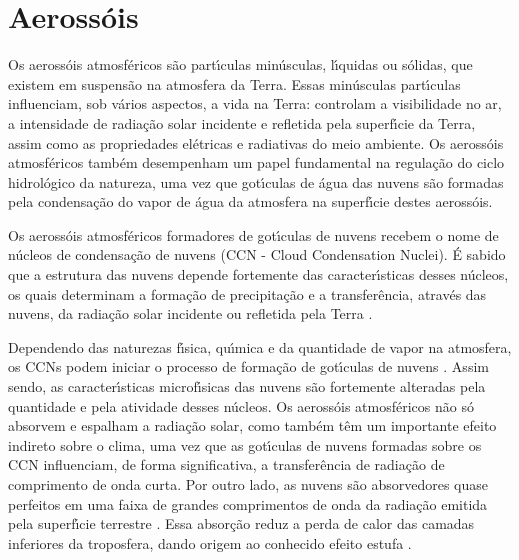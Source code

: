\doublespacing
\chapter{Aeross\'{o}is}
\label{cap:aerossois}

Os aeross\'{o}is atmosf\'{e}ricos s\~{a}o part\'{\i}culas min\'{u}sculas, l\'{\i}quidas ou s\'{o}lidas, que existem em suspens\~{a}o na atmosfera da Terra. Essas min\'{u}sculas part\'{\i}culas influenciam, sob v\'{a}rios aspectos, a vida na Terra: controlam a visibilidade no ar, a intensidade de radia\c{c}\~{a}o solar incidente e refletida pela superf\'{\i}cie da Terra, assim como as propriedades el\'{e}tricas e radiativas do meio ambiente. Os aeross\'{o}is atmosf\'{e}ricos tamb\'{e}m desempenham um papel fundamental na regula\c{c}\~{a}o do ciclo hidrol\'{o}gico da natureza, uma vez que got\'{\i}culas de \'{a}gua das nuvens s\~{a}o formadas pela condensa\c{c}\~{a}o do vapor de \'{a}gua da atmosfera na superf\'{\i}cie destes aeross\'{o}is.

Os aeross\'{o}is atmosf\'{e}ricos formadores de got\'{\i}culas de nuvens recebem o nome de n\'{u}cleos de condensa\c{c}\~{a}o de nuvens (CCN - Cloud Condensation Nuclei). \'{E} sabido que a estrutura das nuvens depende fortemente das caracter\'{\i}sticas desses n\'{u}cleos, os quais determinam a forma\c{c}\~{a}o de precipita\c{c}\~{a}o e a transfer\^{e}ncia, atrav\'{e}s das nuvens, da radia\c{c}\~{a}o solar incidente ou refletida pela Terra \cite{Mendes}.

Dependendo das naturezas f\'{\i}sica, qu\'{\i}mica e da quantidade de vapor na atmosfera, os CCNs podem iniciar o processo de forma\c{c}\~{a}o de got\'{\i}culas de nuvens \cite{HSU}. Assim sendo, as caracter\'{\i}sticas microf\'{\i}sicas das nuvens s\~{a}o fortemente alteradas pela quantidade  e pela atividade desses n\'{u}cleos. Os aeross\'{o}is atmosf\'{e}ricos n\~{a}o s\'{o} absorvem e espalham a radia\c{c}\~{a}o solar, como tamb\'{e}m t\^{e}m um importante efeito indireto sobre o clima, uma vez que as got\'{\i}culas de nuvens formadas sobre os CCN influenciam, de forma significativa, a transfer\^{e}ncia de radia\c{c}\~{a}o de comprimento de onda curta. Por outro lado, as nuvens s\~{a}o absorvedores quase perfeitos em uma faixa de grandes comprimentos de onda da radia\c{c}\~{a}o emitida pela superf\'{\i}cie terrestre \cite{Joel}.  Essa absor\c{c}\~{a}o reduz a perda de calor das camadas inferiores da troposfera, dando origem ao conhecido efeito estufa \cite{Wang}.

